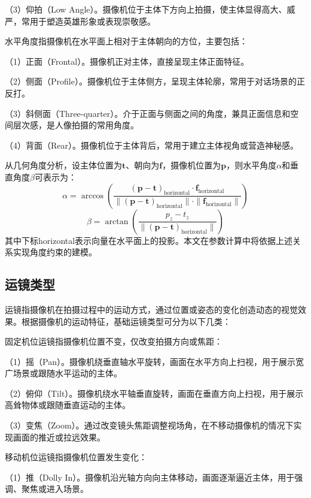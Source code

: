 （3）仰拍（Low Angle）。摄像机位于主体下方向上拍摄，使主体显得高大、威严，常用于塑造英雄形象或表现崇敬感。

水平角度指摄像机在水平面上相对于主体朝向的方位，主要包括：

（1）正面（Frontal）。摄像机正对主体，直接呈现主体正面特征。

（2）侧面（Profile）。摄像机位于主体侧方，呈现主体轮廓，常用于对话场景的正反打。

（3）斜侧面（Three-quarter）。介于正面与侧面之间的角度，兼具正面信息和空间层次感，是人像拍摄的常用角度。

（4）背面（Rear）。摄像机位于主体背后，常用于建立主体视角或营造神秘感。

从几何角度分析，设主体位置为$\mathbf{t}$、朝向为$\mathbf{f}$，摄像机位置为$\mathbf{p}$，则水平角度$\alpha$和垂直角度$\beta$可表示为：
\begin{equation}
\alpha = \arccos\left(\frac{(\mathbf{p} - \mathbf{t})_{\text{horizontal}} \cdot \mathbf{f}_{\text{horizontal}}}{\|(\mathbf{p} - \mathbf{t})_{\text{horizontal}}\| \cdot \|\mathbf{f}_{\text{horizontal}}\|}\right)
\end{equation}
\begin{equation}
\beta = \arctan\left(\frac{p_z - t_z}{\|(\mathbf{p} - \mathbf{t})_{\text{horizontal}}\|}\right)
\end{equation}
其中下标horizontal表示向量在水平面上的投影。本文在参数计算中将依据上述关系实现角度约束的建模。

\subsection{运镜类型}

运镜指摄像机在拍摄过程中的运动方式，通过位置或姿态的变化创造动态的视觉效果\cite{arijon1976grammar}。根据摄像机的运动特征，基础运镜类型可分为以下几类：

固定机位运镜指摄像机位置不变，仅改变拍摄方向或焦距：

（1）摇（Pan）。摄像机绕垂直轴水平旋转，画面在水平方向上扫视，用于展示宽广场景或跟随水平运动的主体。

（2）俯仰（Tilt）。摄像机绕水平轴垂直旋转，画面在垂直方向上扫视，用于展示高耸物体或跟随垂直运动的主体。

（3）变焦（Zoom）。通过改变镜头焦距调整视场角，在不移动摄像机的情况下实现画面的推近或拉远效果。

移动机位运镜指摄像机位置发生变化：

（1）推（Dolly In）。摄像机沿光轴方向向主体移动，画面逐渐逼近主体，用于强调、聚焦或进入场景。

